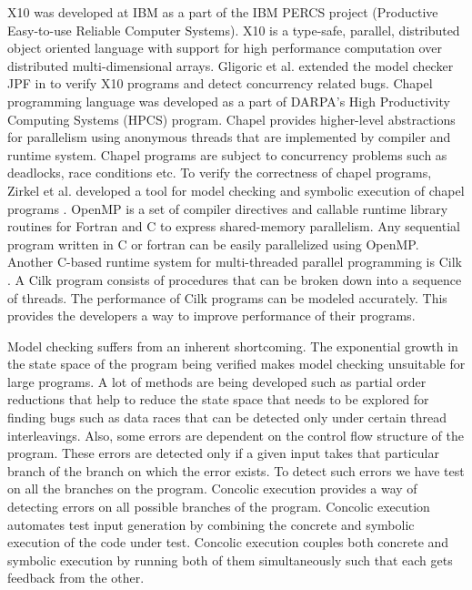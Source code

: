 X10 \cite{charles2005x10} was developed at IBM as a part of the IBM PERCS project (Productive Easy-to-use Reliable Computer Systems). X10 is a type-safe, parallel, distributed object oriented language with support for high performance computation over distributed multi-dimensional arrays. Gligoric et al. extended the model checker JPF in \cite{gligoric2012x10x} to verify X10 programs and detect concurrency related bugs. Chapel programming language \cite{chamberlain2007parallel} was developed as a part of DARPA's High Productivity Computing Systems (HPCS) program. Chapel provides higher-level abstractions for parallelism using anonymous threads that are implemented by compiler and runtime system. Chapel programs are subject to concurrency problems such as deadlocks, race conditions etc. To verify the correctness of chapel programs, Zirkel et al. developed a tool for model checking and symbolic execution of chapel programs \cite{zirkel2013automated}. OpenMP \cite{dagum1998openmp} is a set of compiler directives and callable runtime library routines for Fortran and C to express shared-memory parallelism. Any sequential program written in C or fortran can be easily parallelized using OpenMP. Another C-based runtime system for multi-threaded parallel programming is Cilk \cite{blumofe1996cilk} . A Cilk program consists of procedures that can be broken down into a sequence of threads. The performance of Cilk programs can be modeled accurately. This provides the developers a way to improve performance of their programs.

Model checking suffers from an inherent shortcoming. The exponential growth in the state space of the program being verified makes model checking unsuitable for large programs. A lot of methods are being developed such as partial order reductions that help to reduce the state space that needs to be explored for finding bugs such as data races that can be detected only under certain thread interleavings. Also, some errors are dependent on the control flow structure of the program. These errors are detected only if a given input takes that particular branch of the branch on which the error exists. To detect such errors we have test on all the branches on the program. Concolic execution provides a way of detecting errors on all possible branches of the program. Concolic execution automates test input generation by combining the concrete and symbolic execution of the code under test. Concolic execution couples both concrete and symbolic execution by running both of them simultaneously such that each gets feedback from the other.

